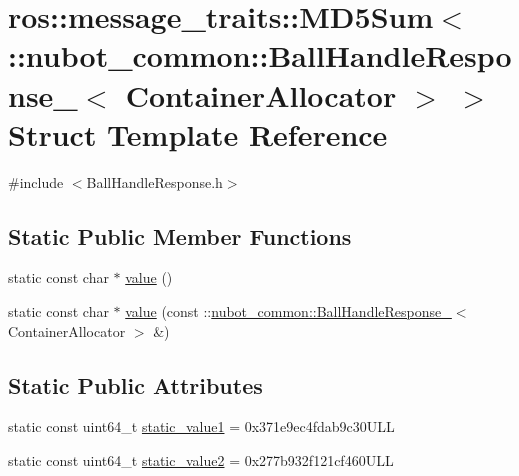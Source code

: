 \hypertarget{structros_1_1message__traits_1_1MD5Sum_3_01_1_1nubot__common_1_1BallHandleResponse___3_01ContainerAllocator_01_4_01_4}{\section{ros\-:\-:message\-\_\-traits\-:\-:M\-D5\-Sum$<$ \-:\-:nubot\-\_\-common\-:\-:Ball\-Handle\-Response\-\_\-$<$ Container\-Allocator $>$ $>$ Struct Template Reference}
\label{structros_1_1message__traits_1_1MD5Sum_3_01_1_1nubot__common_1_1BallHandleResponse___3_01ContainerAllocator_01_4_01_4}
}


{\ttfamily \#include $<$Ball\-Handle\-Response.\-h$>$}

\subsection*{Static Public Member Functions}
\begin{DoxyCompactItemize}
\item 
static const char $\ast$ \hyperlink{structros_1_1message__traits_1_1MD5Sum_3_01_1_1nubot__common_1_1BallHandleResponse___3_01ContainerAllocator_01_4_01_4_afb5db3c588b85353d31ccafd393701c5}{value} ()
\item 
static const char $\ast$ \hyperlink{structros_1_1message__traits_1_1MD5Sum_3_01_1_1nubot__common_1_1BallHandleResponse___3_01ContainerAllocator_01_4_01_4_ac668427eebad85c48308608b9f31a8f4}{value} (const \-::\hyperlink{structnubot__common_1_1BallHandleResponse__}{nubot\-\_\-common\-::\-Ball\-Handle\-Response\-\_\-}$<$ Container\-Allocator $>$ \&)
\end{DoxyCompactItemize}
\subsection*{Static Public Attributes}
\begin{DoxyCompactItemize}
\item 
static const uint64\-\_\-t \hyperlink{structros_1_1message__traits_1_1MD5Sum_3_01_1_1nubot__common_1_1BallHandleResponse___3_01ContainerAllocator_01_4_01_4_a3cb1ec6d97db5e54ed21acfe221f7ef8}{static\-\_\-value1} = 0x371e9ec4fdab9c30\-U\-L\-L
\item 
static const uint64\-\_\-t \hyperlink{structros_1_1message__traits_1_1MD5Sum_3_01_1_1nubot__common_1_1BallHandleResponse___3_01ContainerAllocator_01_4_01_4_a9c2c2a5fccc47f7093ba1946610b4c08}{static\-\_\-value2} = 0x277b932f121cf460\-U\-L\-L
\end{DoxyCompactItemize}


